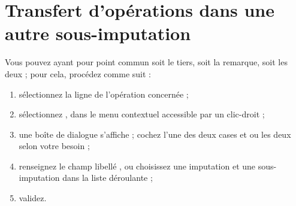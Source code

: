 \ifIllustration
\fi

\section{Transfert d'opérations dans une autre sous-imputation\label{budgetarylines-transfer}}


Vous pouvez  ayant pour point commun soit le tiers, soit la remarque, soit les deux ; pour cela, procédez comme suit :

\begin{enumerate}
	\ifIllustration
	\pichskip{10mm}
	\label{budgetarylines_transfer-img}
	\fi
	 \item sélectionnez la ligne de l'opération concernée ;
	 \item sélectionnez , dans le menu contextuel accessible par un  clic-droit ;
	 \item une boîte de dialogue s'affiche ; cochez l'une des deux cases  et  ou les deux selon votre besoin ;
	 \item renseignez le champ libellé , ou choisissez une imputation et une sous-imputation dans la liste déroulante ;
	 \item validez.
\end{enumerate}

